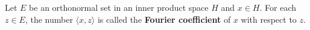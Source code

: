 Let $E$ be an orthonormal set in an inner product space $H$ and $x \in H$. For each $z \in E$, the number $\langle x, z \rangle$ is called the \textbf{Fourier coefficient} of $x$ with respect to $z$.
